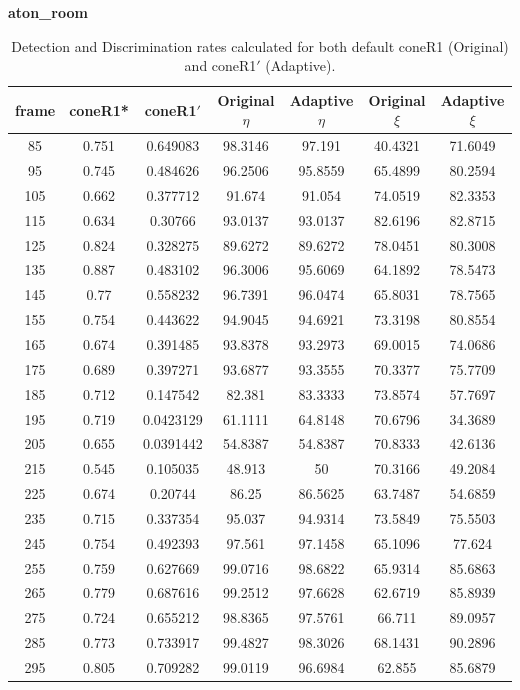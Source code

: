 \begin{appendices}
\begin{table}
\centering
\caption{\textbf{aton\_room}}
\begin{tabular}{ |c|c|c|c|c|c|c| }
\hline
\textbf{frame} &  \textbf{coneR1*} &  \textbf{coneR1$'$} &  \textbf{Original $\eta$} &  \textbf{Adaptive $\eta$} &  \textbf{Original $\xi$} &  \textbf{Adaptive $\xi$} \\
\hline
\hline
85 &  0.751 &  0.649083 &  98.3146 &  97.191 &  40.4321 &  71.6049 \\
\hline
95 &  0.745 &  0.484626 &  96.2506 &  95.8559 &  65.4899 &  80.2594 \\
\hline
105 &  0.662 &  0.377712 &  91.674 &  91.054 &  74.0519 &  82.3353 \\
\hline
115 &  0.634 &  0.30766 &  93.0137 &  93.0137 &  82.6196 &  82.8715 \\
\hline
125 &  0.824 &  0.328275 &  89.6272 &  89.6272 &  78.0451 &  80.3008 \\
\hline
135 &  0.887 &  0.483102 &  96.3006 &  95.6069 &  64.1892 &  78.5473 \\
\hline
145 &  0.77 &  0.558232 &  96.7391 &  96.0474 &  65.8031 &  78.7565 \\
\hline
155 &  0.754 &  0.443622 &  94.9045 &  94.6921 &  73.3198 &  80.8554 \\
\hline
165 &  0.674 &  0.391485 &  93.8378 &  93.2973 &  69.0015 &  74.0686 \\
\hline
175 &  0.689 &  0.397271 &  93.6877 &  93.3555 &  70.3377 &  75.7709 \\
\hline
185 &  0.712 &  0.147542 &  82.381 &  83.3333 &  73.8574 &  57.7697 \\
\hline
195 &  0.719 &  0.0423129 &  61.1111 &  64.8148 &  70.6796 &  34.3689 \\
\hline
205 &  0.655 &  0.0391442 &  54.8387 &  54.8387 &  70.8333 &  42.6136 \\
\hline
215 &  0.545 &  0.105035 &  48.913 &  50 &  70.3166 &  49.2084 \\
\hline
225 &  0.674 &  0.20744 &  86.25 &  86.5625 &  63.7487 &  54.6859 \\
\hline
235 &  0.715 &  0.337354 &  95.037 &  94.9314 &  73.5849 &  75.5503 \\
\hline
245 &  0.754 &  0.492393 &  97.561 &  97.1458 &  65.1096 &  77.624 \\
\hline
255 &  0.759 &  0.627669 &  99.0716 &  98.6822 &  65.9314 &  85.6863 \\
\hline
265 &  0.779 &  0.687616 &  99.2512 &  97.6628 &  62.6719 &  85.8939 \\
\hline
275 &  0.724 &  0.655212 &  98.8365 &  97.5761 &  66.711 &  89.0957 \\
\hline
285 &  0.773 &  0.733917 &  99.4827 &  98.3026 &  68.1431 &  90.2896 \\
\hline
295 &  0.805 &  0.709282 &  99.0119 &  96.6984 &  62.855 &  85.6879 \\
\hline
\end{tabular}
\caption*{Detection and Discrimination rates calculated for both default coneR1 (Original) and coneR1$'$ (Adaptive).}
\end{table}


\end{appendices}
